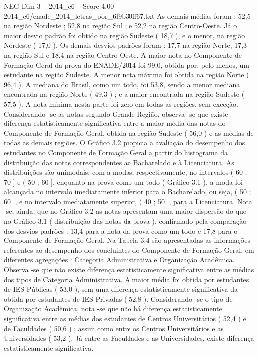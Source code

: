 \begin{textsample}{NEG Dim 3 – 2014\_c6 – Score 4.00 – 2014\_c6/enade\_2014\_letras\_por\_6f9b30ff67.txt}
As demais médias foram : 52,5 na região Nordeste ; 52,8 na região Sul ; e 52,2 na região Centro-Oeste.
Já o maior desvio padrão foi obtido na região Sudeste ( 18,7 ), e o menor, na região Nordeste ( 17,0 ).
Os demais desvios padrões foram : 17,7 na região Norte, 17,3 na região Sul e 18,4 na região Centro-Oeste.
A maior nota no Componente de Formação Geral da prova do ENADE/2014 foi 99,0, obtida por, pelo menos, um estudante na região Sudeste.
A menor nota máxima foi obtida na região Norte ( 96,4 ).
A mediana do Brasil, como um todo, foi 53,8, sendo a menor mediana encontrada na região Norte ( 49,3 ) ; e a maior encontrada na região Sudeste ( 57,5 ).
A nota mínima nesta parte foi zero em todas as regiões, sem exceção.
Considerando -se as notas segundo Grande Região, observa -se que existe diferença estatisticamente significativa entre a maior média das notas do Componente de Formação Geral, obtida na região Sudeste ( 56,0 ) e as médias de todas as demais regiões.
O Gráfico 3.2 propicia a avaliação do desempenho dos estudantes no Componente de Formação Geral a partir do histograma da distribuição das notas correspondentes ao Bacharelado e à Licenciatura.
As distribuições são unimodais, com a modas, respectivamente, no intervalos ( 60 ; 70 ] e ( 50 ; 60 ], enquanto na prova como um todo ( Gráfico 3.1 ), a moda foi alcançada no intervalo imediatamente inferior para o Bacharelado, ou seja, ( 50 ; 60 ], e no intervalo imediatamente superior, ( 40 ; 50 ], para a Licenciatura.
Nota -se, ainda, que no Gráfico 3.2 as notas apresentam uma maior dispersão do que no Gráfico 3.1 ( distribuição das notas da prova ), confirmado pela comparação dos desvios padrões : 13,4 para a nota da prova como um todo e 17,8 para o Componente de Formação Geral.
Na Tabela 3.4 são apresentadas as informações referentes ao desempenho dos concluintes do Componente de Formação Geral, em diferentes agregações : Categoria Administrativa e Organização Acadêmica.
Observa -se que não existe diferença estatisticamente significativa entre as médias dos tipos de Categoria Administrativa.
A maior média foi obtida por estudantes de IES Públicas ( 53,0 ), sem uma diferença estatisticamente significativa da obtida por estudantes de IES Privadas ( 52,8 ).
Considerando -se o tipo de Organização Acadêmica, nota -se que não há diferença estatisticamente significativa entre as médias dos estudantes de Centros Universitários ( 52,4 ) e de Faculdades ( 50,6 ) ; assim como entre os Centros Universitários e as Universidades ( 53,2 ).
Já entre as Faculdades e as Universidades, existe diferença estatisticamente significativa.

\end{textsample}

